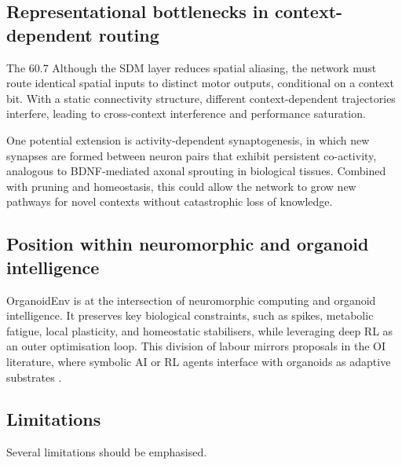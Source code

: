 \documentclass[journal]{IEEEtran}
\begin{document}
\subsection{Representational bottlenecks in context-dependent routing}

The 60.7%
Although the SDM layer reduces spatial aliasing, the network must route identical spatial inputs to distinct motor outputs, conditional on a context bit. 
With a static connectivity structure, different context-dependent trajectories interfere, leading to cross-context interference and performance saturation.

One potential extension is activity-dependent synaptogenesis, in which new synapses are formed between neuron pairs that exhibit persistent co-activity, analogous to BDNF-mediated axonal sprouting in biological tissues. 
Combined with pruning and homeostasis, this could allow the network to grow new pathways for novel contexts without catastrophic loss of knowledge.

\subsection{Position within neuromorphic and organoid intelligence}

OrganoidEnv is at the intersection of neuromorphic computing and organoid intelligence. 
It preserves key biological constraints, such as spikes, metabolic fatigue, local plasticity, and homeostatic stabilisers, while leveraging deep RL as an outer optimisation loop. 
This division of labour mirrors proposals in the OI literature, where symbolic AI or RL agents interface with organoids as adaptive substrates \cite{Smirnova2023OI,Hartung2023OIworkshop,Xiong2024BridgingAI}.

\subsection{Limitations}

Several limitations should be emphasised.
\end{document}

